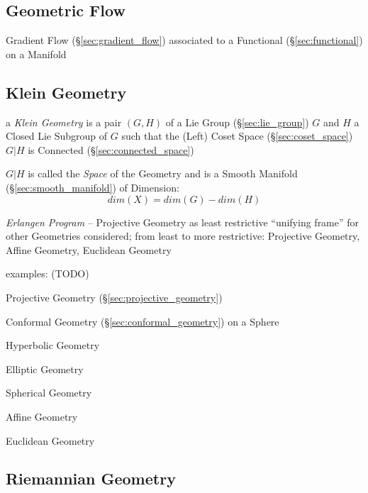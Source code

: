 \begin{itemize}
\subsection{Geometric Flow}\label{sec:geometric_flow}

Gradient Flow (\S\ref{sec:gradient_flow}) associated to a Functional
(\S\ref{sec:functional}) on a Manifold



\subsection{Klein Geometry}\label{sec:klein_geometry}

a \emph{Klein Geometry} is a pair $(G,H)$ of a Lie Group
(\S\ref{sec:lie_group}) $G$ and $H$ a Closed Lie Subgroup of $G$ such
that the (Left) Coset Space (\S\ref{sec:coset_space}) $G|H$ is
Connected (\S\ref{sec:connected_space})

$G|H$ is called the \emph{Space} of the Geometry and is a Smooth
Manifold (\S\ref{sec:smooth_manifold}) of Dimension:
\[
  dim(X) = dim(G) - dim(H)
\]

\emph{Erlangen Program} -- Projective Geometry as least restrictive
``unifying frame'' for other Geometries considered; from least to more
restrictive: Projective Geometry, Affine Geometry, Euclidean Geometry

examples: (TODO)

Projective Geometry (\S\ref{sec:projective_geometry})

Conformal Geometry (\S\ref{sec:conformal_geometry}) on a Sphere

Hyperbolic Geometry

Elliptic Geometry

Spherical Geometry

Affine Geometry

Euclidean Geometry



\subsection{Riemannian Geometry}\label{sec:riemannian_geometry}


\end{itemize}
